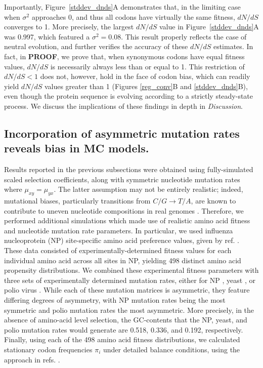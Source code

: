 \documentclass{pnastwo}
\begin{document}
\begin{article}
Importantly, Figure~\ref{stddev_dnds}A demonstrates that, in the limiting case when $\sigma^2$ approaches 0, and thus all codons have virtually the same fitness, $dN/dS$ converges to 1. More precisely, the largest $dN/dS$ value in Figure~\ref{stddev_dnds}A was 0.997, which featured a $\sigma^2 = 0.08$. This result properly reflects the case of neutral evolution, and further verifies the accuracy of these $dN/dS$ estimates. In fact, in \textbf{PROOF}, we prove that, when synonymous codons have equal fitness values, $dN/dS$ is necessarily always less than or equal to 1.  This restriction of $dN/dS < 1$ does not, however, hold in the face of codon bias, which can readily yield $dN/dS$ values greater than 1 (Figures \ref{reg_conv}B and \ref{stddev_dnds}B), even though the protein sequence is evolving according to a strictly steady-state process. We discuss the implications of these findings in depth in \textit{Discussion}.


\subsection*{Incorporation of asymmetric mutation rates reveals bias in MC models.}

Results reported in the previous subsections were obtained using fully-simulated scaled selection coefficients, along with symmetric nucleotide mutation rates where $\mu_{xy} = \mu_{yx}$. The latter assumption may not be entirely realistic; indeed, mutational biases, particularly transitions from $C/G \rightarrow T/A$, are known to contribute to uneven nucleotide compositions in real genomes \cite{Hernandez2007,HershbergPetrov2010,Zhu2014,Acevedo2014}. Therefore, we performed additional simulations which made use of realistic amino acid fitness and nucleotide mutation rate parameters. In particular, we used influenza nucleoprotein (NP) site-specific amino acid preference values, given by ref. \cite{Bloom2014a}. These data consisted of experimentally-determined fitness values for each individual amino acid across all sites in NP, yielding 498 distinct amino acid propensity distributions. We combined these experimental fitness parameters with three sets of experimentally determined mutation rates, either for NP \cite{Bloom2014a}, yeast \cite{Zhu2014}, or polio virus \cite{Acevedo2014}. While each of these mutation matrices is asymmetric, they feature differing degrees of asymmetry, with NP mutation rates being the most symmetric and polio mutation rates the most asymmetric. More precisely, in the absence of amino-acid level selection, the GC-contents that the NP, yeast, and polio mutation rates would generate are 0.518, 0.336, and 0.192, respectively. Finally, using each of the 498 amino acid fitness distributions, we calculated stationary codon frequencies $\pi_i$ under detailed balance conditions, using the approach in refs. \cite{Bloom2014a,Bloom2014b}. 


\end{article}
\end{document}
